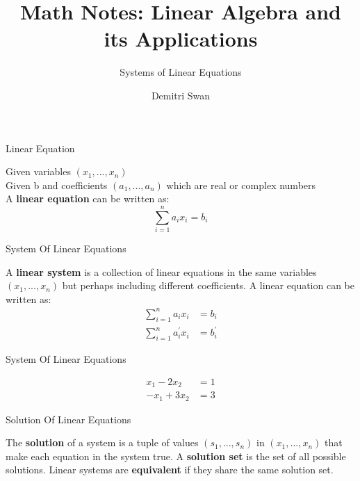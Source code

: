 \documentclass{beamer}
\title{Math Notes: Linear Algebra and its Applications}
\subtitle[short subtitle]{Systems of Linear Equations}
\author{Demitri Swan}
\date{}
\begin{document}
\begin{frame}
  \titlepage %
\end{frame}

\begin{frame}{Linear Equation}
\begin{definition}
Given variables $\left(x_{1}, ... , x_{n}\right)$\\
Given b and coefficients $\left(a_{1}, ... ,a_{n}\right)$ which are real or complex numbers\\
A \textbf{linear equation} can be written as:\\
\[ \sum_{i=1}^{n} a_{i}x_{i} = b_{i} \]
\end{definition}
\end{frame}

\begin{frame}{System Of Linear Equations}
\begin{definition}
A \textbf{linear system} is a collection of linear equations in the same variables $\left(x_{1}, ... ,x_{n}\right)$ 
but perhaps including different coefficients. A linear equation can be written as:\\
\begin{align*}
\sum_{i=1}^{n} a_{i}x_{i} &= b_{i} \\
\sum_{i=1}^{n} a^{\prime}_{i}x_{i} &= b^{\prime}_{i}
\end{align*}
\end{definition}
\end{frame}

\begin{frame}{System Of Linear Equations}
\begin{example}
\begin{align*}
x_{1} - 2x_{2} &= 1\\
-x_{1} + 3x_{2} &= 3
\end{align*}
\end{example}
\end{frame}

\begin{frame}{Solution Of Linear Equations}
\begin{definition}
The \textbf{solution} of a system is a tuple of values $\left(s_{1}, ... , s_{n}\right)$ in $\left(x_{1}, ... ,x_{n}\right)$ 
that make each equation in the system true. A \textbf{solution set} is the set of all possible solutions. 
Linear systems are \textbf{equivalent} if they share the same solution set.
\end{definition}
\end{frame}
\end{document}
